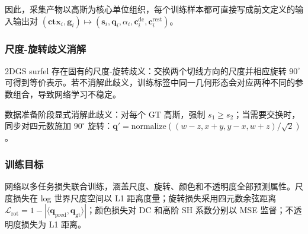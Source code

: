 因此，采集产物以高斯为核心单位组织，每个训练样本都可直接写成前文定义的输入输出对 $(\mathbf{ctx}_i, \mathbf{g}_i) \mapsto (\mathbf{s}_i, \mathbf{q}_i, \alpha_i, \mathbf{c}_i^{\mathrm{dc}}, \mathbf{c}_i^{\mathrm{rest}})$。

\subsubsection{尺度-旋转歧义消解}

2DGS surfel 存在固有的尺度-旋转歧义：交换两个切线方向的尺度并相应旋转 $90^\circ$ 可得到等价表示。若不消解此歧义，训练标签中同一几何形态会对应两种不同的参数组合，导致网络学习不稳定。

数据准备阶段显式消解此歧义：对每个 GT 高斯，强制 $s_1 \geq s_2$；当需要交换时，同步对四元数施加 $90^\circ$ 旋转：$\mathbf{q}' = \text{normalize}((w-z, x+y, y-x, w+z) / \sqrt{2})$。

\subsubsection{训练目标}

网络以多任务损失联合训练，涵盖尺度、旋转、颜色和不透明度全部预测属性。尺度损失在 log 世界尺度空间以 L1 距离度量；旋转损失采用四元数余弦距离 $\mathcal{L}_{\text{rot}} = 1 - |\langle \mathbf{q}_{\text{pred}}, \mathbf{q}_{\text{gt}} \rangle|$；颜色损失对 DC 和高阶 SH 系数分别以 MSE 监督；不透明度损失为 L1 距离。
